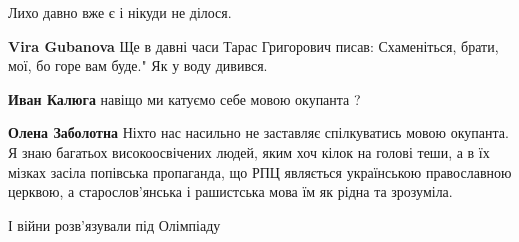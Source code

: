 \begin{itemize}
\begin{itemize}
 
Лихо давно вже є і нікуди не ділося.

 
\textbf{Vira Gubanova} Ще в давні часи Тарас Григорович писав: Схаменіться, брати, мої, бо горе вам буде." Як у воду дивився.

 
\textbf{Иван Калюга} навіщо ми катуємо себе мовою окупанта ?

 
\textbf{Олена Заболотна} Ніхто нас насильно не заставляє спілкуватись мовою
окупанта. Я знаю багатьох високоосвічених людей, яким хоч кілок на голові теши,
а в їх мізках засіла попівська пропаганда, що РПЦ являється українською
православною церквою, а старослов'янська і рашистська мова їм як рідна та
зрозуміла.
\end{itemize}

 
І війни розв'язували під Олімпіаду

 


\end{itemize}

